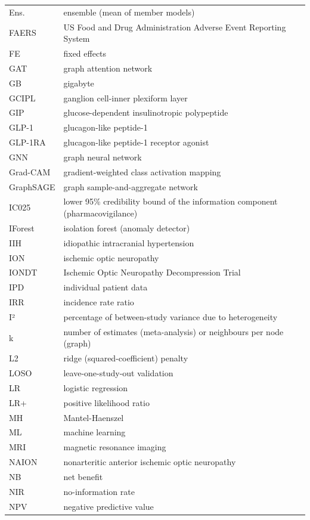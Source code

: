 \documentclass[
  11pt,
]{article}
\begin{document}
\begin{longtable}[]{@{}
  >{\raggedright\arraybackslash}p{}
  >{\raggedright\arraybackslash}p{}@{}}
Ens. & ensemble (mean of member models) \\
FAERS & US Food and Drug Administration Adverse Event Reporting
System \\
FE & fixed effects \\
GAT & graph attention network \\
GB & gigabyte \\
GCIPL & ganglion cell-inner plexiform layer \\
GIP & glucose-dependent insulinotropic polypeptide \\
GLP-1 & glucagon-like peptide-1 \\
GLP-1RA & glucagon-like peptide-1 receptor agonist \\
GNN & graph neural network \\
Grad-CAM & gradient-weighted class activation mapping \\
GraphSAGE & graph sample-and-aggregate network \\
IC025 & lower 95\% credibility bound of the information component
(pharmacovigilance) \\
IForest & isolation forest (anomaly detector) \\
IIH & idiopathic intracranial hypertension \\
ION & ischemic optic neuropathy \\
IONDT & Ischemic Optic Neuropathy Decompression Trial \\
IPD & individual patient data \\
IRR & incidence rate ratio \\
I² & percentage of between-study variance due to heterogeneity \\
k & number of estimates (meta-analysis) or neighbours per node
(graph) \\
L2 & ridge (squared-coefficient) penalty \\
LOSO & leave-one-study-out validation \\
LR & logistic regression \\
LR+ & positive likelihood ratio \\
MH & Mantel-Haenszel \\
ML & machine learning \\
MRI & magnetic resonance imaging \\
NAION & nonarteritic anterior ischemic optic neuropathy \\
NB & net benefit \\
NIR & no-information rate \\
NPV & negative predictive value \\

\end{longtable}
\end{document}

